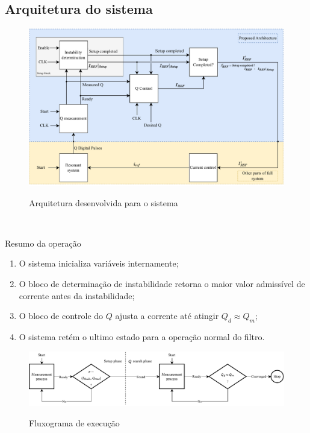 \subsection{Arquitetura do sistema}

\begin{frame}[plain]

\begin{figure}[H]
    \centering
    \caption{Arquitetura desenvolvida para o sistema}
    \includegraphics[width=.8\textwidth]{fig/tcc-nova-arq.pdf}
    \label{f-arq-sys}
\end{figure}

\flushright
\scriptsize
\insertframenumber~\frameofframes~\inserttotalframenumber
    
\end{frame}

\begin{frame}{Resumo da operação}

\begin{enumerate}
    \item O sistema inicializa variáveis internamente;
    \item O bloco de determinação de instabilidade retorna o maior valor admissível de corrente antes da instabilidade;
    \item O bloco de controle do $Q$ ajusta a corrente até atingir $Q_d \approx Q_m$;
    \item O sistema retém o ultimo estado para a operação normal do filtro.
\end{enumerate}
    
\end{frame}


\begin{frame}{}
\begin{figure}[H]
    \centering
    \caption{Fluxograma de execução}
    \includegraphics{fig/fluxograma.pdf}
    \label{f-fluxograma}
\end{figure}

\end{frame}

